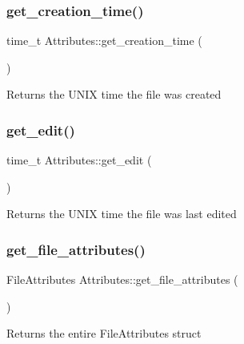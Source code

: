 \subsubsection{\texorpdfstring{get\+\_\+creation\+\_\+time()}{get\_creation\_time()}}
{\footnotesize\ttfamily time\+\_\+t Attributes\+::get\+\_\+creation\+\_\+time (\begin{DoxyParamCaption}{ }\end{DoxyParamCaption})}

\begin{DoxyReturn}{Returns}
the U\+N\+IX time the file was created 
\end{DoxyReturn}
\mbox{\label{class_attributes_a4ff80c2f3a31f86d874d7982354e4f70}} 
\subsubsection{\texorpdfstring{get\+\_\+edit()}{get\_edit()}}
{\footnotesize\ttfamily time\+\_\+t Attributes\+::get\+\_\+edit (\begin{DoxyParamCaption}{ }\end{DoxyParamCaption})}

\begin{DoxyReturn}{Returns}
the U\+N\+IX time the file was last edited 
\end{DoxyReturn}
\mbox{\label{class_attributes_a774666651c1d61cade39cc15cf03b9b2}} 
\subsubsection{\texorpdfstring{get\+\_\+file\+\_\+attributes()}{get\_file\_attributes()}}
{\footnotesize\ttfamily File\+Attributes Attributes\+::get\+\_\+file\+\_\+attributes (\begin{DoxyParamCaption}{ }\end{DoxyParamCaption})}

\begin{DoxyReturn}{Returns}
the entire File\+Attributes struct 
\end{DoxyReturn}
\mbox{\label{class_attributes_a8b9efe0186ccf74b4b08c4031a99f5bb}} 
